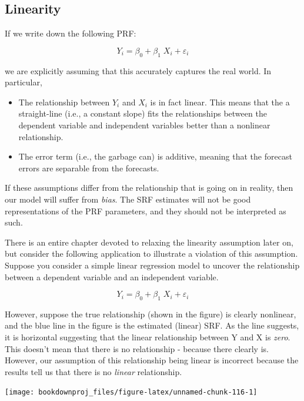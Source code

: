 \documentclass[
]{book}
\begin{document}
\subsection{Linearity}\label{linearity}

If we write down the following PRF:

\[Y_i = \beta_0 + \beta_1 \;X_{i}+\varepsilon_i\]

we are explicitly assuming that this accurately captures the real world. In particular,

\begin{itemize}
\item
  The relationship between \(Y_i\) and \(X_i\) is in fact linear. This means that the a straight-line (i.e., a constant slope) fits the relationships between the dependent variable and independent variables better than a nonlinear relationship.
\item
  The error term (i.e., the garbage can) is additive, meaning that the forecast errors are separable from the forecasts.
\end{itemize}

If these assumptions differ from the relationship that is going on in reality, then our model will suffer from \emph{bias}. The SRF estimates will not be good representations of the PRF parameters, and they should not be interpreted as such.

There is an entire chapter devoted to relaxing the linearity assumption later on, but consider the following application to illustrate a violation of this assumption. Suppose you consider a simple linear regression model to uncover the relationship between a dependent variable and an independent variable.

\[Y_i=\beta_0+\beta_1 \; X_i+\varepsilon_i\]

However, suppose the true relationship (shown in the figure) is clearly nonlinear, and the blue line in the figure is the estimated (linear) SRF. As the line suggests, it is horizontal suggesting that the linear relationship between Y and X is \emph{zero}. This doesn't mean that there is no relationship - because there clearly is. However, our assumption of this relationship being linear is incorrect because the results tell us that there is no \emph{linear} relationship.

\begin{center}\texttt{[image: bookdownproj\_files/figure-latex/unnamed-chunk-116-1]} \end{center}
\end{document}
